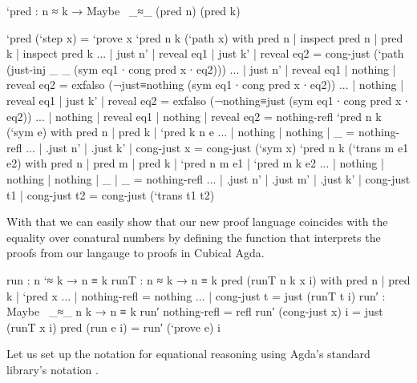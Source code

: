 \begin{code}
`pred : n ≈ k → Maybe~ _≈_ (pred n) (pred k)
\end{code}
\begin{code}[hide]
`pred (`step x) = `prove x
`pred {n} {k} (`path x) with pred n | inspect pred n | pred k | inspect pred k
... | just n' | reveal eq1 | just k' | reveal eq2 = cong-just (`path (just-inj _ _ (sym eq1 ∙ cong pred x ∙ eq2)))
... | just n' | reveal eq1 | nothing | reveal eq2 = exfalso (¬just≡nothing (sym eq1 ∙ cong pred x ∙ eq2))
... | nothing | reveal eq1 | just k' | reveal eq2 = exfalso (¬nothing≡just (sym eq1 ∙ cong pred x ∙ eq2))
... | nothing | reveal eq1 | nothing | reveal eq2 = nothing-refl
`pred {n} {k} (`sym e) with pred n | pred k | `pred {k} {n} e
... | nothing  | nothing  | _ = nothing-refl
... | .just n' | .just k' | cong-just x = cong-just (`sym x)
`pred {n} {k} (`trans {m} e1 e2) with pred n | pred m | pred k | `pred {n} {m} e1 | `pred {m} {k} e2
... | nothing  | nothing  | nothing  | _  | _  = nothing-refl
... | .just n' | .just m' | .just k' | cong-just t1 | cong-just t2 = cong-just (`trans t1 t2)
\end{code}

With that we can easily show that our new proof language coincides with the equality over conatural numbers
by defining the  function that interprets the proofs from our langauge to
proofs in Cubical Agda.

\begin{code}
run : n `≈ k → n ≡ k
runT : n ≈ k → n ≡ k
pred (runT {n} {k} x i) with {pred n} | {pred k} | `pred x
... | nothing-refl = nothing
... | cong-just t = just (runT t i)
run′ : Maybe~ _≈_ n k → n ≡ k
run′ nothing-refl = refl
run′ (cong-just x) i = just (runT x i)
pred (run e i) = run′ (`prove e) i
\end{code}

Let us set up the notation for equational reasoning using
Agda's standard library's notation \cite{agda-stdlib}.

